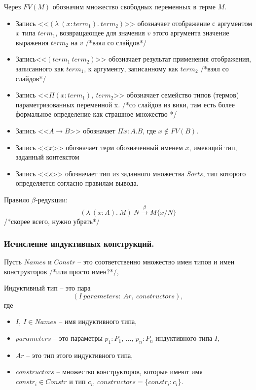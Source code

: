 \documentclass[12pt]{article}
\begin{document}

Через $FV(M)$ обозначим множество свободных переменных в терме $M$.
\begin{itemize}
    \item Запись <<$(\lambda\ (x: term_1).\ term_2)$>>
обозначает отображение с аргументом $x$ типа $term_1$, 
возвращающее для значения $v$ этого аргумента 
значение выражения $term_2$ на $v$ /*взял со слайдов*/

    \item Запись<<$(term_1\ term_2)$>> обозначает результат 
применения отображения,
записанного как $term_1$, к аргументу, 
записанному как $term_2$ /*взял со слайдов*/

    \item Запись <<$\Pi (x:term_1),\ term_2$>> 
обозначает семейство типов (термов)
параметризованных переменной x. /*со слайдов из вики, там есть более формальное определение как страшное множество */

    \item Запись <<$A \xrightarrow{} B$>> обозначает $\Pi x:A. B$, где $x \notin FV(B)$.
    
    \item Запись <<$x$>> обозначает терм обозначенный именем $x$, имеющий тип, заданный контекстом
    
    \item Запись <<$s$>> обозначает тип из заданного множества $Sorts$, тип которого определяется согласно правилам вывода.
    
    
\end{itemize}





Правило $\beta$-редукции:
$$(\lambda\ (x: A).\ M)\ N \xrightarrow{\beta} M\{x/N\}$$
/*скорее всего, нужно убрать*/


\subsubsection{Исчисление индуктивных конструкций.}
Пусть $Names$ и $Constr$ -- это соответственно множество имен типов и имен конструкторов /*или просто имен?*/, 

Индуктивный тип -- это пара $$(I\ parameters:\ Ar,\ constructors),$$ где

\begin{itemize}
    \item $I,\ I \in Names$ -- имя индуктивного типа,
    \item $parameters$ -- это параметры $p_1:P_1$, ..., $p_n:P_n$ индуктивного типа $I$,
    \item $Ar$ -- это тип этого индуктивного типа,
    \item $constructors$ -- множество конструкторов, 
которые имеют имя $constr_i \in Constr$ и тип $c_i$,
$constructors = \{constr_i: c_i\}$.
\end{itemize}
\end{document}
